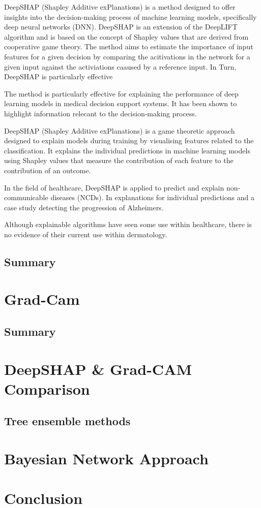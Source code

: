 DeepSHAP (Shapley Additive exPlanations) is a method designed to offer insights into the decision-making process of machine learning models, specifically deep neural networks (DNN). DeepSHAP is an extension of the DeepLIFT algorithm and is based on the concept of Shapley values that are derived from cooperative game theory. The method aims to estimate the importance of input features for a given decision by comparing the acitivations in the network for a given input against the activiations caaused by a reference input. In Turn, DeepSHAP is particularly effective

The method is particularly effective for explaining the performance of deep learning models in medical decision support systems\cite{}. It has been shown to highlight information relecant to the decision-making process. 

DeepSHAP (Shapley Additive exPlanations) is a game theoretic approach designed to explain models during training by visualising features related to the classification. It explains the individual predictions in machine learning models using Shapley values that measure the contribution of each feature to the contribution of an outcome\cite{Aas2021}.

In the field of healthcare, DeepSHAP is applied to predict and explain non-communicable diseases (NCDs). In explanations for individual predictions and a case study detecting the progression of Alzheimers. 

Although explainable algorithms have seen some use within healthcare, there is no evidence of their current use within dermatology.






\subsection{Summary}

\section{Grad-Cam}




\subsection{Summary}


\section{DeepSHAP & Grad-CAM Comparison}

\subsection{Tree ensemble methods}


\section{Bayesian Network Approach}


\section{Conclusion}